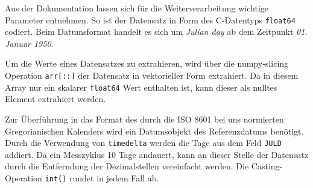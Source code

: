     Aus der Dokumentation lassen sich für die Weiterverarbeitung wichtige Parameter entnehmen.
    So ist der Datensatz in Form des C-Datentyps \texttt{float64} codiert. Beim Datumsformat handelt es sich um \textit{Julian day} ab dem Zeitpunkt \textit{01. Januar 1950}.
    
    Um die Werte eines Datensatzes zu extrahieren, wird über die numpy-slicing Operation \texttt{arr[::]} der Datensatz in vektorieller Form extrahiert. Da in diesem Array nur ein skalarer \texttt{float64} Wert enthalten ist, kann dieser als nulltes Element extrahiert werden.
    
    Zur Überführung in das Format des durch die ISO 8601 bei uns normierten Gregorianischen Kalenders wird ein Datumsobjekt des Referenzdatums benötigt. Durch die Verwendung von \texttt{timedelta} werden die Tage aus dem Feld \texttt{JULD} addiert. Da ein Messzyklus 10 Tage andauert, kann an dieser Stelle der Datensatz durch die Entferndung der Dezimalstellen vereinfacht werden. Die Casting-Operation \texttt{int()} rundet in jedem Fall ab.
    


        

 
   
